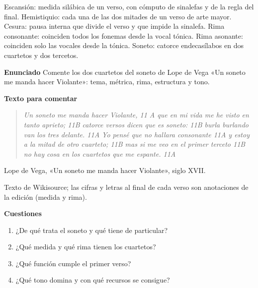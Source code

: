 \documentclass{book}
\begin{document}
\begin{tcolorbox}[title={Definición}, studiumdef, breakable]

Escansión: medida silábica de un verso, con cómputo de sinalefas y de la regla del final. Hemistiquio: cada una de las dos mitades de un verso de arte mayor. Cesura: pausa interna que divide el verso y que impide la sinalefa. Rima consonante: coinciden todos los fonemas desde la vocal tónica. Rima asonante: coinciden solo las vocales desde la tónica. Soneto: catorce endecasílabos en dos cuartetos y dos tercetos.

\end{tcolorbox}

\begin{tcolorbox}[title={Ejercicio resuelto}, studiumworked, breakable]

\noindent\textbf{Enunciado}
Comente los dos cuartetos del soneto de Lope de Vega «Un soneto me manda hacer Violante»: tema, métrica, rima, estructura y tono.


\noindent\textbf{Texto para comentar}

\begin{quote}
\itshape Un soneto me manda hacer Violante, 11 A que en mi vida me he visto en tanto aprieto; 11B catorce versos dicen que es soneto: 11B burla burlando van los tres delante. 11A Yo pensé que no hallara consonante 11A y estoy a la mitad de otro cuarteto; 11B mas si me veo en el primer terceto 11B no hay cosa en los cuartetos que me espante. 11A
\end{quote}
{\noindent\footnotesize Lope de Vega, «Un soneto me manda hacer Violante», siglo XVII.\par}
{\noindent\footnotesize Texto de Wikisource; las cifras y letras al final de cada verso son anotaciones de la edición (medida y rima).\par}

\noindent\textbf{Cuestiones}
\begin{enumerate}
\item ¿De qué trata el soneto y qué tiene de particular?
\item ¿Qué medida y qué rima tienen los cuartetos?
\item ¿Qué función cumple el primer verso?
\item ¿Qué tono domina y con qué recursos se consigue?
\end{enumerate}


\end{tcolorbox}
\end{document}
